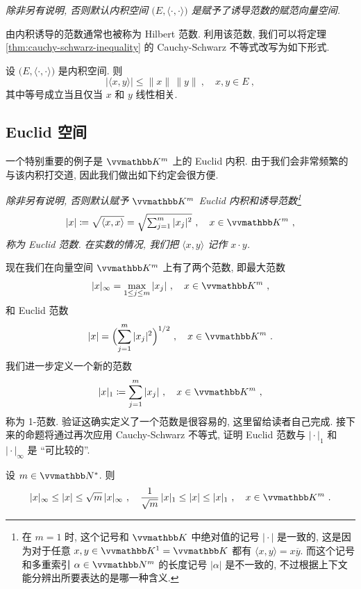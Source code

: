 \begin{center}
    \textsl{除非另有说明, 否则默认内积空间 \(\bigl(E, \langle \cdot, \cdot \rangle\bigr)\) 是赋予了诱导范数的赋范向量空间.}
\end{center}

由内积诱导的范数通常也被称为 Hilbert 范数. 利用该范数, 我们可以将定理 \ref{thm:cauchy-schwarz-inequality} 的 Cauchy-Schwarz 不等式改写为如下形式.

\begin{corollary}
    设 \(\bigl(E, \langle \cdot, \cdot \rangle\bigr)\) 是内积空间. 则
    \[
        |\langle x, y \rangle| \leq \|x\|\, \|y\|\ ,\quad x, y \in E\ ,
    \]
    其中等号成立当且仅当 \(x\) 和 \(y\) 线性相关.
\end{corollary}

\subsection{Euclid 空间}

一个特别重要的例子是 \(\K^m\) 上的 Euclid 内积. 由于我们会非常频繁的与该内积打交道, 因此我们做出如下约定会很方便.

\begin{center}
    \textsl{除非另有说明, 否则默认赋予 \(\K^m\) Euclid 内积和诱导范数\footnote{在 \(m = 1\) 时, 这个记号和 \(\K\) 中绝对值的记号 \(|\!\cdot\!|\) 是一致的, 这是因为对于任意 \(x, y \in \K^1 = \K\) 都有 \(\langle x, y \rangle = x \overline y\). 而这个记号和多重索引 \(\alpha \in \N^m\) 的长度记号 \(|\alpha|\) 是不一致的, 不过根据上下文能分辨出所要表达的是哪一种含义.}
    \[
        |x| \coloneqq \sqrt{\langle x, x \rangle} = \sqrt{\textstyle \sum_{j = 1}^m |x_j|^2}\ ,\quad x \in \K^m\ ,
    \]
    称为 Euclid 范数. 在实数的情况, 我们把 \(\langle x, y \rangle\) 记作 \(x \cdot y\).}
\end{center}

现在我们在向量空间 \(\K^m\) 上有了两个范数, 即最大范数
\[
    |x|_\infty = \max_{1 \leq j \leq m} |x_j|\ ,\quad x \in \K^m\ ,
\]
和 Euclid 范数
\[
    |x| = \Bigl(\sum_{j = 1}^m |x_j|^2\Bigr)^{1 / 2}\ ,\quad x \in \K^m\ .
\]
我们进一步定义一个新的范数
\[
    |x|_1 \coloneqq \sum_{j = 1}^m |x_j|\ ,\quad x \in \K^m\ ,
\]
称为 1-范数. 验证这确实定义了一个范数是很容易的, 这里留给读者自己完成. 接下来的命题将通过再次应用 Cauchy-Schwarz 不等式, 证明 Euclid 范数与 \(|\!\cdot\!|_1\) 和 \(|\!\cdot\!|_\infty\) 是 ``可比较的''.

\begin{proposition}\label{prop:Lp-norms-are-equivalent}
    设 \(m \in \N^\ast\). 则
    \[
        |x|_\infty \leq |x| \leq \sqrt{m}\, |x|_\infty\ ,\quad \frac{1}{\sqrt{m}}\, |x|_1 \leq |x| \leq |x|_1\ ,\quad x \in \K^m\ .
    \]
\end{proposition}

